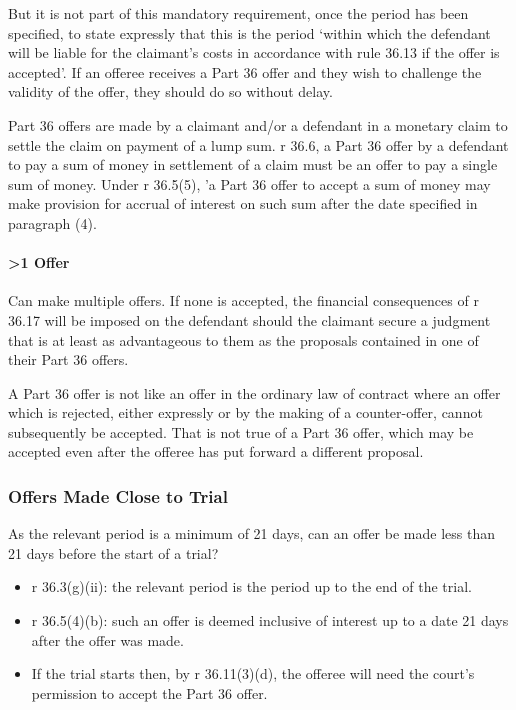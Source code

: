 \documentclass[
]{article}
\providecommand{\tightlist}{%
  \setlength{\itemsep}{0pt}\setlength{\parskip}{0pt}}
\begin{document}
But it is not part of this mandatory requirement, once the period has
been specified, to state expressly that this is the period `within which
the defendant will be liable for the claimant's costs in accordance with
rule 36.13 if the offer is accepted'. If an offeree receives a Part 36
offer and they wish to challenge the validity of the offer, they should
do so without delay.

Part 36 offers are made by a claimant and/or a defendant in a monetary
claim to settle the claim on payment of a lump sum. r 36.6, a Part 36
offer by a defendant to pay a sum of money in settlement of a claim must
be an offer to pay a single sum of money. Under r 36.5(5), 'a Part 36
offer to accept a sum of money may make provision for accrual of
interest on such sum after the date specified in paragraph (4).

\hypertarget{offer}{%
\paragraph{\textgreater1 Offer}\label{offer}}

Can make multiple offers. If none is accepted, the financial
consequences of r 36.17 will be imposed on the defendant should the
claimant secure a judgment that is at least as advantageous to them as
the proposals contained in one of their Part 36 offers.

A Part 36 offer is not like an offer in the ordinary law of contract
where an offer which is rejected, either expressly or by the making of a
counter-offer, cannot subsequently be accepted. That is not true of a
Part 36 offer, which may be accepted even after the offeree has put
forward a different proposal.

\hypertarget{offers-made-close-to-trial}{%
\subsubsection{Offers Made Close to
Trial}\label{offers-made-close-to-trial}}

As the relevant period is a minimum of 21 days, can an offer be made
less than 21 days before the start of a trial?

\begin{itemize}
\tightlist
\item
  r 36.3(g)(ii): the relevant period is the period up to the end of the
  trial.
\item
  r 36.5(4)(b): such an offer is deemed inclusive of interest up to a
  date 21 days after the offer was made.
\item
  If the trial starts then, by r 36.11(3)(d), the offeree will need the
  court's permission to accept the Part 36 offer.
\end{itemize}
\end{document}
